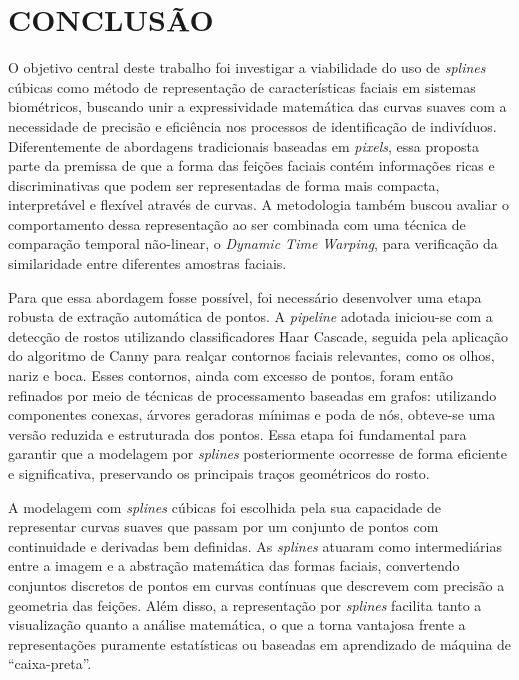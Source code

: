 \chapter{CONCLUSÃO} \label{cha:conclusao}

O objetivo central deste trabalho foi investigar a viabilidade do uso de \textit{splines} cúbicas como método de representação de características faciais em sistemas biométricos, buscando unir a expressividade matemática das curvas suaves com a necessidade de precisão e eficiência nos processos de identificação de indivíduos. Diferentemente de abordagens tradicionais baseadas em \textit{pixels}, essa proposta parte da premissa de que a forma das feições faciais contém informações ricas e discriminativas que podem ser representadas de forma mais compacta, interpretável e flexível através de curvas. A metodologia também buscou avaliar o comportamento dessa representação ao ser combinada com uma técnica de comparação temporal não-linear, o \textit{Dynamic Time Warping}, para verificação da similaridade entre diferentes amostras faciais.

Para que essa abordagem fosse possível, foi necessário desenvolver uma etapa robusta de extração automática de pontos. A \textit{pipeline} adotada iniciou-se com a detecção de rostos utilizando classificadores Haar Cascade, seguida pela aplicação do algoritmo de Canny para realçar contornos faciais relevantes, como os olhos, nariz e boca. Esses contornos, ainda com excesso de pontos, foram então refinados por meio de técnicas de processamento baseadas em grafos: utilizando componentes conexas, árvores geradoras mínimas e poda de nós, obteve-se uma versão reduzida e estruturada dos pontos. Essa etapa foi fundamental para garantir que a modelagem por \textit{splines} posteriormente ocorresse de forma eficiente e significativa, preservando os principais traços geométricos do rosto.

A modelagem com \textit{splines} cúbicas foi escolhida pela sua capacidade de representar curvas suaves que passam por um conjunto de pontos com continuidade e derivadas bem definidas. As \textit{splines} atuaram como intermediárias entre a imagem e a abstração matemática das formas faciais, convertendo conjuntos discretos de pontos em curvas contínuas que descrevem com precisão a geometria das feições. Além disso, a representação por \textit{splines} facilita tanto a visualização quanto a análise matemática, o que a torna vantajosa frente a representações puramente estatísticas ou baseadas em aprendizado de máquina de ``caixa-preta''.



